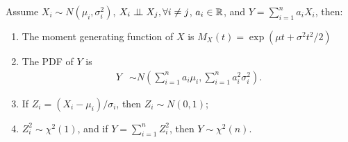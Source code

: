 \begin{theorem} 
Assume $X_i\sim N(\mu_i,\sigma_i^2)$, $X_i\perp\!\!\!\perp X_j,\forall i\ne j$, $a_i\in\mathbb{R}$, and $Y=\sum_{i=1}^na_iX_i$, then:
	\begin{enumerate}
		\item The moment generating function of $X$ is $M_X(t)=\exp(\mu t+\sigma^2t^2/2)$
		\item The PDF of $Y$ is
			\begin{equation}
			\begin{aligned}
			Y &\sim N\left(\sum_{i=1}^na_i\mu_i,\sum_{i=1}^na^2_i\sigma_i^2\right).
			\end{aligned}
			\end{equation}
		\item If $Z_i=(X_i-\mu_i)/\sigma_i$, then $Z_i\sim N(0,1)$;
		\item $Z^2_i\sim \chi^2(1)$, and if $Y=\sum_{i=1}^nZ_i^2$, then $Y\sim \chi^2(n)$.
	\end{enumerate}
\end{theorem}
